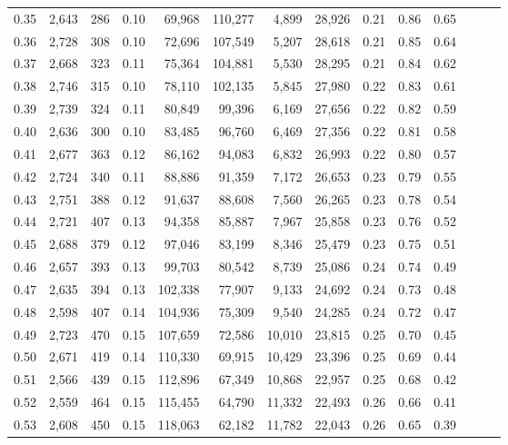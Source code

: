 \begin{tabular}{rrrrrrrrrrrrrr}
0.35 &  2,643 &    286 &  0.10 &   69,968 &  110,277 &   4,899 &  28,926 &  0.21 &  0.86 &      0.65 \\
0.36 &  2,728 &    308 &  0.10 &   72,696 &  107,549 &   5,207 &  28,618 &  0.21 &  0.85 &      0.64 \\
0.37 &  2,668 &    323 &  0.11 &   75,364 &  104,881 &   5,530 &  28,295 &  0.21 &  0.84 &      0.62 \\
0.38 &  2,746 &    315 &  0.10 &   78,110 &  102,135 &   5,845 &  27,980 &  0.22 &  0.83 &      0.61 \\
0.39 &  2,739 &    324 &  0.11 &   80,849 &   99,396 &   6,169 &  27,656 &  0.22 &  0.82 &      0.59 \\
0.40 &  2,636 &    300 &  0.10 &   83,485 &   96,760 &   6,469 &  27,356 &  0.22 &  0.81 &      0.58 \\
0.41 &  2,677 &    363 &  0.12 &   86,162 &   94,083 &   6,832 &  26,993 &  0.22 &  0.80 &      0.57 \\
0.42 &  2,724 &    340 &  0.11 &   88,886 &   91,359 &   7,172 &  26,653 &  0.23 &  0.79 &      0.55 \\
0.43 &  2,751 &    388 &  0.12 &   91,637 &   88,608 &   7,560 &  26,265 &  0.23 &  0.78 &      0.54 \\
0.44 &  2,721 &    407 &  0.13 &   94,358 &   85,887 &   7,967 &  25,858 &  0.23 &  0.76 &      0.52 \\
0.45 &  2,688 &    379 &  0.12 &   97,046 &   83,199 &   8,346 &  25,479 &  0.23 &  0.75 &      0.51 \\
0.46 &  2,657 &    393 &  0.13 &   99,703 &   80,542 &   8,739 &  25,086 &  0.24 &  0.74 &      0.49 \\
0.47 &  2,635 &    394 &  0.13 &  102,338 &   77,907 &   9,133 &  24,692 &  0.24 &  0.73 &      0.48 \\
0.48 &  2,598 &    407 &  0.14 &  104,936 &   75,309 &   9,540 &  24,285 &  0.24 &  0.72 &      0.47 \\
0.49 &  2,723 &    470 &  0.15 &  107,659 &   72,586 &  10,010 &  23,815 &  0.25 &  0.70 &      0.45 \\
0.50 &  2,671 &    419 &  0.14 &  110,330 &   69,915 &  10,429 &  23,396 &  0.25 &  0.69 &      0.44 \\
0.51 &  2,566 &    439 &  0.15 &  112,896 &   67,349 &  10,868 &  22,957 &  0.25 &  0.68 &      0.42 \\
0.52 &  2,559 &    464 &  0.15 &  115,455 &   64,790 &  11,332 &  22,493 &  0.26 &  0.66 &      0.41 \\
0.53 &  2,608 &    450 &  0.15 &  118,063 &   62,182 &  11,782 &  22,043 &  0.26 &  0.65 &      0.39 \\

\end{tabular}
